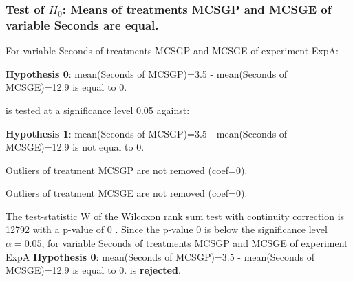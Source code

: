 \begin{frame}[t]
 \frametitle{Test of $H_{0}$: Means of treatments MCSGP and MCSGE of variable Seconds are equal. }
 \scriptsize
 For variable Seconds of treatments MCSGP and MCSGE of experiment ExpA:

\vspace{1mm}
{\bf Hypothesis 0}: mean(Seconds of MCSGP)=3.5 - mean(Seconds of MCSGE)=12.9 is equal to 0.


 \begin{center} is tested at a significance level 0.05 against: \end{center}

{\bf Hypothesis 1}: mean(Seconds of MCSGP)=3.5 - mean(Seconds of MCSGE)=12.9 is not equal to 0.
\vspace{1mm}
\vspace{1mm}

 Outliers of treatment MCSGP  are not removed (coef=0).

 Outliers of treatment MCSGE  are not removed (coef=0).
\vspace{1mm}
 
 The test-statistic W of the Wilcoxon rank sum test with continuity correction is 12792 with a p-value of 0 .
 Since the p-value 0 is below the significance level $\alpha= 0.05 $,
 for variable Seconds of treatments MCSGP and MCSGE of experiment ExpA 
 {\bf Hypothesis 0}: mean(Seconds of MCSGP)=3.5 - mean(Seconds of MCSGE)=12.9 is equal to 0.
is {\bf rejected}.

 \end{frame}
